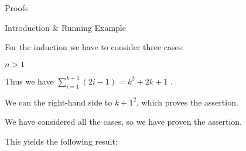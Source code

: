 \begin{sfragment}{Proofs}
\begin{sfragment}{Introduction \& Running Example}
\begin{latexcode}
\begin{sproof}[id=simple-proof]
\begin{spfcases}{For the induction we have to consider three cases:}
\begin{spfcase}{$n>1$}
      \begin{spfstep}
        Thus we have $\sum_{i=1}^{k+1}{(2i-1)}=k^2+2k+1$
        .
      \end{spfstep}
      \begin{spfstep}[type=conclusion]
        We can  the right-hand side to
        ${k+1}^2$, which proves the assertion.
      \end{spfstep}
   \end{spfcase}
    \begin{spfstep}[type=conclusion]
      We have considered all the cases, so we have proven the assertion.
    \end{spfstep}
  \end{spfcases}
\end{sproof}
\end{latexcode}

This yields the following result: 


\end{sfragment}
\end{sfragment}
